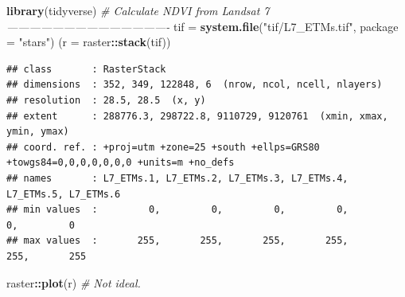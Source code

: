 \documentclass[]{article}
\newenvironment{Shaded}{\begin{snugshade}}{\end{snugshade}}
\newcommand{\CommentTok}[1]{\textcolor[rgb]{0.56,0.35,0.01}{\textit{#1}}}
\newcommand{\DataTypeTok}[1]{\textcolor[rgb]{0.13,0.29,0.53}{#1}}
\newcommand{\KeywordTok}[1]{\textcolor[rgb]{0.13,0.29,0.53}{\textbf{#1}}}
\newcommand{\NormalTok}[1]{#1}
\newcommand{\OperatorTok}[1]{\textcolor[rgb]{0.81,0.36,0.00}{\textbf{#1}}}
\newcommand{\StringTok}[1]{\textcolor[rgb]{0.31,0.60,0.02}{#1}}
\begin{document}
\begin{Shaded}
\end{Shaded}

\begin{Shaded}
\begin{Highlighting}[]
\KeywordTok{library}\NormalTok{(tidyverse)}
\CommentTok{# Calculate NDVI from Landsat 7 -------------------------------------------}
\NormalTok{tif =}\StringTok{ }\KeywordTok{system.file}\NormalTok{(}\StringTok{"tif/L7_ETMs.tif"}\NormalTok{, }\DataTypeTok{package =} \StringTok{"stars"}\NormalTok{)}
\NormalTok{(}\DataTypeTok{r =}\NormalTok{ raster}\OperatorTok{::}\KeywordTok{stack}\NormalTok{(tif))}
\end{Highlighting}
\end{Shaded}

\begin{verbatim}
## class       : RasterStack 
## dimensions  : 352, 349, 122848, 6  (nrow, ncol, ncell, nlayers)
## resolution  : 28.5, 28.5  (x, y)
## extent      : 288776.3, 298722.8, 9110729, 9120761  (xmin, xmax, ymin, ymax)
## coord. ref. : +proj=utm +zone=25 +south +ellps=GRS80 +towgs84=0,0,0,0,0,0,0 +units=m +no_defs 
## names       : L7_ETMs.1, L7_ETMs.2, L7_ETMs.3, L7_ETMs.4, L7_ETMs.5, L7_ETMs.6 
## min values  :         0,         0,         0,         0,         0,         0 
## max values  :       255,       255,       255,       255,       255,       255
\end{verbatim}

\begin{Shaded}
\begin{Highlighting}[]
\NormalTok{raster}\OperatorTok{::}\KeywordTok{plot}\NormalTok{(r) }\CommentTok{# Not ideal.}
\end{Highlighting}
\end{Shaded}
\end{document}
